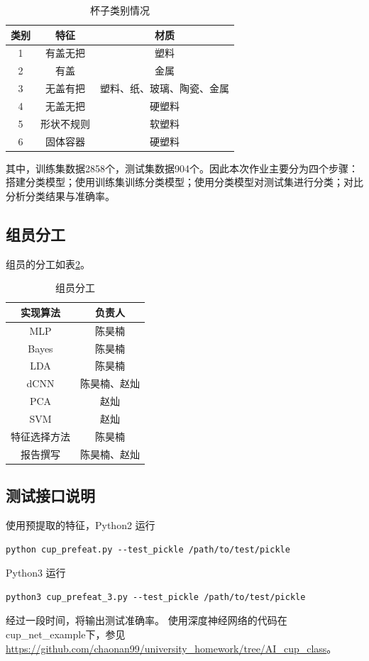 	\begin{table}[htbp]
	\centering
	\begin{tabular}{ccc}
	\toprule
	类别 & 特征 & 材质 \\
	\midrule
	1 & 有盖无把 & 塑料 \\
	2 & 有盖 & 金属 \\
	3 & 无盖有把 & \multicolumn{1}{p{2.6cm}}{塑料、纸、玻璃、陶瓷、金属} \\
	4 & 无盖无把 & 硬塑料 \\
	5 & 形状不规则 & 软塑料 \\
	6 & 固体容器 & 硬塑料 \\
	\bottomrule
	\end{tabular}
	\caption{杯子类别情况}
	\label{tab:cupclass}
	\end{table}

	其中，训练集数据2858个，测试集数据904个。因此本次作业主要分为四个步骤：搭建分类模型；使用训练集训练分类模型；使用分类模型对测试集进行分类；对比分析分类结果与准确率。

\subsection{组员分工}
组员的分工如表\ref{tab:job}。

\begin{table}[htbp]
\centering
\begin{tabular}{cc}
\hline
实现算法 & 负责人 \\
\hline
MLP & 陈昊楠 \\
Bayes & 陈昊楠 \\
LDA & 陈昊楠 \\
dCNN & 陈昊楠、赵灿 \\
PCA & 赵灿 \\
SVM & 赵灿 \\
特征选择方法 & 陈昊楠 \\
报告撰写 & 陈昊楠、赵灿 \\
\hline
\end{tabular}
\caption{组员分工}
\label{tab:job}
\end{table}

\subsection{测试接口说明}
使用预提取的特征，Python2 运行
\begin{lstlisting}
python cup_prefeat.py --test_pickle /path/to/test/pickle
\end{lstlisting}
Python3 运行
\begin{lstlisting}
python3 cup_prefeat_3.py --test_pickle /path/to/test/pickle
\end{lstlisting}
经过一段时间，将输出测试准确率。
使用深度神经网络的代码在{\ttfamily cup\_net\_example}下，参见 \url{https://github.com/chaonan99/university_homework/tree/AI_cup_class}。

